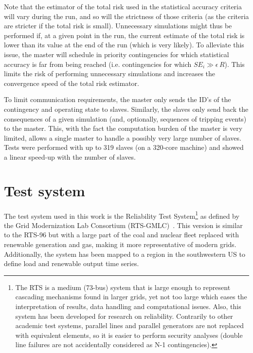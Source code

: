 Note that the estimator of the total risk used in the statistical accuracy criteria will vary during the run, and so will the strictness of those criteria (as the criteria are stricter if the total risk is small). Unnecessary simulations might thus be performed if, at a given point in the run, the current estimate of the total risk is lower than its value at the end of the run (which is very likely). To alleviate this issue, the master will schedule in priority contingencies for which statistical accuracy is far from being reached (i.e. contingencies for which \(SE_i \gg \epsilon \, R\)). This limits the risk of performing unnecessary simulations and increases the convergence speed of the total risk estimator.

To limit communication requirements, the master only sends the ID's of the contingency and operating state to slaves. Similarly, the slaves only send back the consequences of a given simulation (and, optionally, sequences of tripping events) to the master. This, with the fact the computation burden of the master is very limited, allows a single master to handle a possibly very large number of slaves. Tests were performed with up to 319 slaves (on a 320-core machine) and showed a linear speed-up with the number of slaves.


\section{Test system}
\label{sec:PDSA_test_system}

The test system used in this work is the Reliability Test System\footnote{The RTS is a medium (73-bus) system that is large enough to represent cascading mechanisms found in larger grids, yet not too large which eases the interpretation of results, data handling and computational issues. Also, this system has been developed for research on reliability. Contrarily to other academic test systems, parallel lines and parallel generators are not replaced with equivalent elements, so it is easier to perform security analyses (double line failures are not accidentally considered as N-1 contingencies).} as defined by the Grid Modernization Lab Consortium (RTS-GMLC)~\cite{RTS-GMLC}. This version is similar to the RTS-96 but with a large part of the coal and nuclear fleet replaced with renewable generation and gas, making it more representative of modern grids. Additionally, the system has been mapped to a region in the southwestern US to define load and renewable output time series.

